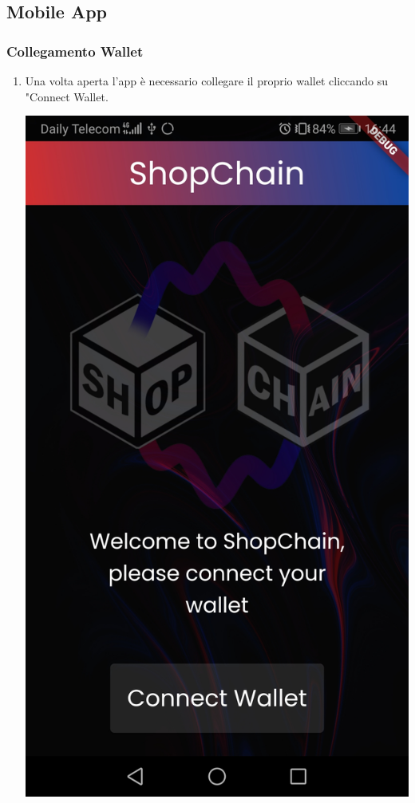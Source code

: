 \pagebreak
\subsection{Mobile App}
\subsubsection{Collegamento Wallet}
\begin{enumerate}
    \item Una volta aperta l'app è necessario collegare il proprio wallet cliccando su "Connect Wallet.\\
    
    \begin{center}
        \includegraphics[scale = 0.1]{img/connectMobile.jpg}
    \end{center}
    

\end{enumerate}
